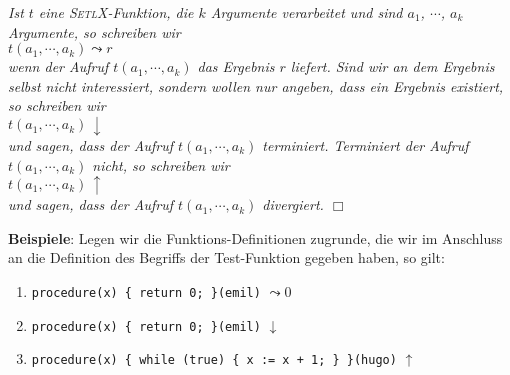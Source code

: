 \begin{Notation}[$\leadsto$, $\downarrow$, $\uparrow$]
{\em
Ist $t$ eine \textsc{SetlX}-Funktion, die $k$ Argumente verarbeitet und sind $a_1$, $\cdots$, $a_k$ Argumente,
so schreiben wir \\[0.3cm]
\hspace*{1.3cm} $t(a_1, \cdots, a_k) \leadsto r$ \\[0.3cm]
wenn der Aufruf $t(a_1, \cdots, a_k)$ das Ergebnis $r$ liefert.  Sind wir an dem Ergebnis
selbst nicht interessiert, sondern wollen nur angeben, dass ein Ergebnis existiert, so
schreiben wir \\[0.3cm]
\hspace*{1.3cm} $t(a_1, \cdots, a_k) \,\downarrow$ \\[0.3cm]
und sagen, dass der Aufruf $t(a_1, \cdots, a_k)$ \emph{terminiert}.
Terminiert der Aufruf $t(a_1, \cdots, a_k)$ nicht, so schreiben wir \\[0.3cm]
\hspace*{1.3cm} $t(a_1, \cdots, a_k) \,\uparrow$ \\[0.3cm]
und sagen, dass der Aufruf $t(a_1, \cdots, a_k)$ \emph{divergiert}.
\hspace*{\fill} $\Box$
}
\end{Notation}

\noindent
\textbf{Beispiele}: Legen wir die Funktions-Definitionen zugrunde, die wir im Anschluss an
die Definition des Begriffs der Test-Funktion gegeben haben, so gilt:
\begin{enumerate}
\item {\tt procedure(x) \{ return 0; \}(emil)} $\leadsto 0$
\item {\tt procedure(x) \{ return 0; \}(emil)} $\downarrow$
\item {\tt procedure(x) \{ while (true) \{ x := x + 1; \} \}(hugo)} $\uparrow$
\end{enumerate} 


